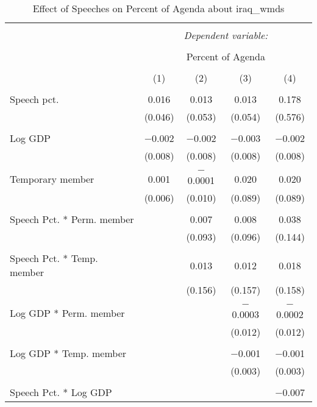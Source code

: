 
\begin{table}[!htbp] \centering 
  \caption{Effect of Speeches on Percent of Agenda about  iraq_wmds} 
  \label{} 
\begin{tabular}{@{\extracolsep{5pt}}lcccc} 
\\[-1.8ex]\hline 
\hline \\[-1.8ex] 
 & \multicolumn{4}{c}{\textit{Dependent variable:}} \\ 
\cline{2-5} 
\\[-1.8ex] & \multicolumn{4}{c}{Percent of Agenda} \\ 
\\[-1.8ex] & (1) & (2) & (3) & (4)\\ 
\hline \\[-1.8ex] 
 Speech pct. & 0.016 & 0.013 & 0.013 & 0.178 \\ 
  & (0.046) & (0.053) & (0.054) & (0.576) \\ 
  & & & & \\ 
 Log GDP & $-$0.002 & $-$0.002 & $-$0.003 & $-$0.002 \\ 
  & (0.008) & (0.008) & (0.008) & (0.008) \\ 
  & & & & \\ 
 Temporary member & 0.001 & $-$0.0001 & 0.020 & 0.020 \\ 
  & (0.006) & (0.010) & (0.089) & (0.089) \\ 
  & & & & \\ 
 Speech Pct. * Perm. member &  & 0.007 & 0.008 & 0.038 \\ 
  &  & (0.093) & (0.096) & (0.144) \\ 
  & & & & \\ 
 Speech Pct. * Temp. member &  & 0.013 & 0.012 & 0.018 \\ 
  &  & (0.156) & (0.157) & (0.158) \\ 
  & & & & \\ 
 Log GDP * Perm. member &  &  & $-$0.0003 & $-$0.0002 \\ 
  &  &  & (0.012) & (0.012) \\ 
  & & & & \\ 
 Log GDP * Temp. member &  &  & $-$0.001 & $-$0.001 \\ 
  &  &  & (0.003) & (0.003) \\ 
  & & & & \\ 
 Speech Pct. * Log GDP &  &  &  & $-$0.007 \\ 

\end{tabular}
\end{table}
